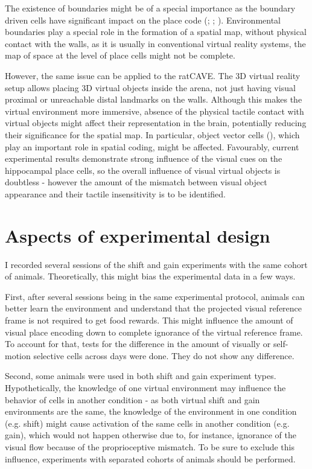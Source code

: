 The existence of boundaries might be of a special importance as the boundary driven cells have significant impact on the place code (\cite{Okeefe1996}; \cite{Barry2006}; \cite{Savelli2008}). Environmental boundaries play a special role in the formation of a spatial map, without physical contact with the walls, as it is usually in conventional virtual reality systems, the map of space at the level of place cells might not be complete.

However, the same issue can be applied to the ratCAVE. The 3D virtual reality setup allows placing 3D virtual objects inside the arena, not just having visual proximal or unreachable distal landmarks on the walls. Although this makes the virtual environment more immersive, absence of the physical tactile contact with virtual objects might affect their representation in the brain, potentially reducing their significance for the spatial map. In particular, object vector cells (\cite{Hooydal2019}), which play an important role in spatial coding, might be affected. Favourably, current experimental results demonstrate strong influence of the visual cues on the hippocampal place cells, so the overall influence of visual virtual objects is doubtless - however the amount of the mismatch between visual object appearance and their tactile insensitivity is to be identified.


\section{Aspects of experimental design}
\label{sec:aspects_of_design}

I recorded several sessions of the shift and gain experiments with the same cohort of animals. Theoretically, this might bias the experimental data in a few ways.

First, after several sessions being in the same experimental protocol, animals can better learn the environment and understand that the projected visual reference frame is not required to get food rewards. This might influence the amount of visual place encoding down to complete ignorance of the virtual reference frame. To account for that, tests for the difference in the amount of visually or self-motion selective cells across days were done. They do not show any difference.

Second, some animals were used in both shift and gain experiment types. Hypothetically, the knowledge of one virtual environment may influence the behavior of cells in another condition - as both virtual shift and gain environments are the same, the knowledge of the environment in one condition (e.g. shift) might cause activation of the same cells in another condition (e.g. gain), which would not happen otherwise due to, for instance, ignorance of the visual flow because of the proprioceptive mismatch. To be sure to exclude this influence, experiments with separated cohorts of animals should be performed.



